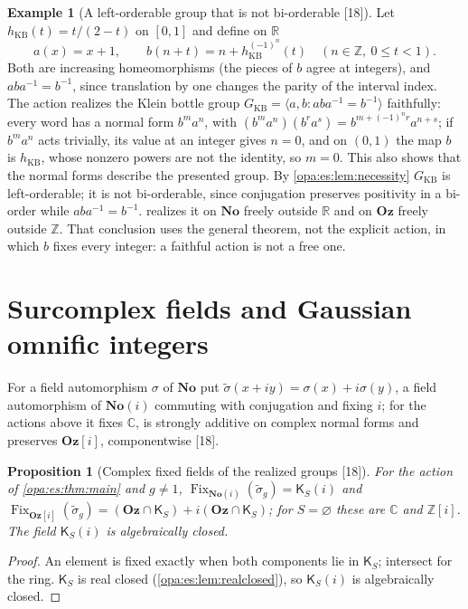 \documentclass[11pt,oneside]{article}
\numberwithin{equation}{section}
\newtheorem{proposition}[proposition]{Proposition}
\theoremstyle{definition}
\newtheorem{example}[example]{Example}
\theoremstyle{remark}
\newcommand{\No}{\mathbf{No}}
\newcommand{\Oz}{\mathbf{Oz}}
\newcommand{\Og}{\mathbf{Oz}[i]}
\newcommand{\SC}{\mathbf{No}(i)}
\newcommand{\R}{\mathbb R}
\newcommand{\C}{\mathbb C}
\newcommand{\Z}{\mathbb Z}
\newcommand{\Fix}{\operatorname{Fix}}
\newcommand{\src}[1]{\textup{\textsf{\small[#1]}}}
\begin{document}
\begin{example}[A left-orderable group that is not bi-orderable \src{18}]\label{opa:es:ex:kleinbottle}
Let $h_{\mathrm{KB}}(t)=t/(2-t)$ on $[0,1]$ and define on $\R$
\begin{equation}\label{opa:es:eq:kb}
 a(x)=x+1,\qquad b(n+t)=n+h_{\mathrm{KB}}^{(-1)^n}(t)\quad(n\in\Z,\ 0\le t<1).
\end{equation}
Both are increasing homeomorphisms (the pieces of $b$ agree at integers), and $aba^{-1}=b^{-1}$, since translation by one changes the parity
of the interval index. The action realizes the Klein bottle group $G_{\mathrm{KB}}=\langle a,b:aba^{-1}=b^{-1}\rangle$ faithfully: every word
has a normal form $b^ma^n$, with $(b^ma^n)(b^ra^s)=b^{m+(-1)^nr}a^{n+s}$; if $b^ma^n$ acts trivially, its value at an integer gives $n=0$,
and on $(0,1)$ the map $b$ is $h_{\mathrm{KB}}$, whose nonzero powers are not the identity, so $m=0$. This also shows that the normal forms
describe the presented group. By \cref{opa:es:lem:necessity} $G_{\mathrm{KB}}$ is left-orderable; it is not bi-orderable, since conjugation
preserves positivity in a bi-order while $aba^{-1}=b^{-1}$.  realizes it on $\No$ freely outside $\R$ and on $\Oz$
freely outside $\Z$. That conclusion uses the general theorem, not the explicit action, in which $b$ fixes every integer: a faithful action
is not a free one.
\end{example}

\section{Surcomplex fields and Gaussian omnific integers}\label{opa:es:sec:complex}

For a field automorphism $\sigma$ of $\No$ put $\widetilde\sigma(x+iy)=\sigma(x)+i\sigma(y)$, a field automorphism of $\SC$ commuting with
conjugation and fixing $i$; for the actions above it fixes $\C$, is strongly additive on complex normal forms and preserves $\Og$,
componentwise \src{18}.

\begin{proposition}[Complex fixed fields of the realized groups \src{18}]\label{opa:es:prop:complexfixed}
For the action of \cref{opa:es:thm:main} and $g\ne1$, $\Fix_{\SC}(\widetilde\sigma_g)=\mathsf K_S(i)$ and
$\Fix_{\Og}(\widetilde\sigma_g)=(\Oz\cap\mathsf K_S)+i(\Oz\cap\mathsf K_S)$; for $S=\varnothing$ these are $\C$ and $\Z[i]$. The field $\mathsf K_S(i)$ is
algebraically closed.
\end{proposition}
\begin{proof}
An element is fixed exactly when both components lie in $\mathsf K_S$; intersect for the ring. $\mathsf K_S$ is real closed
(\cref{opa:es:lem:realclosed}), so $\mathsf K_S(i)$ is algebraically closed.
\end{proof}
\end{document}

